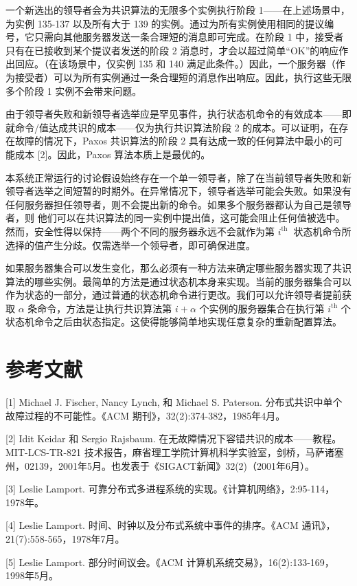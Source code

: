 \documentclass[12pt,a4paper]{report} %
\begin{document}
一个新选出的领导者会为共识算法的无限多个实例执行阶段 1——在上述场景中，为实例 135-137 以及所有大于 139 的实例。通过为所有实例使用相同的提议编号，它只需向其他服务器发送一条合理短的消息即可完成。在阶段 1 中，接受者只有在已接收到某个提议者发送的阶段 2 消息时，才会以超过简单“OK”的响应作出回应。（在该场景中，仅实例 135 和 140 满足此条件。）因此，一个服务器（作为接受者）可以为所有实例通过一条合理短的消息作出响应。因此，执行这些无限多个阶段 1 实例不会带来问题。

由于领导者失败和新领导者选举应是罕见事件，执行状态机命令的有效成本——即就命令/值达成共识的成本——仅为执行共识算法阶段 2 的成本。可以证明，在存在故障的情况下，Paxos 共识算法的阶段 2 具有达成一致的任何算法中最小的可能成本 [2]。因此，Paxos 算法本质上是最优的。

本系统正常运行的讨论假设始终存在一个单一领导者，除了在当前领导者失败和新领导者选举之间短暂的时期外。在异常情况下，领导者选举可能会失败。如果没有任何服务器担任领导者，则不会提出新的命令。如果多个服务器都认为自己是领导者，则
他们可以在共识算法的同一实例中提出值，这可能会阻止任何值被选中。然而，安全性得以保持——两个不同的服务器永远不会就作为第 $i^{\text {th }}$ 状态机命令所选择的值产生分歧。仅需选举一个领导者，即可确保进度。

如果服务器集合可以发生变化，那么必须有一种方法来确定哪些服务器实现了共识算法的哪些实例。最简单的方法是通过状态机本身来实现。当前的服务器集合可以作为状态的一部分，通过普通的状态机命令进行更改。我们可以允许领导者提前获取 $\alpha$ 条命令，方法是让执行共识算法第 $i+\alpha$ 个实例的服务器集合在执行第 $i^{\text {th}}$ 个状态机命令之后由状态指定。这使得能够简单地实现任意复杂的重新配置算法。

\section*{参考文献}

[1] Michael J. Fischer, Nancy Lynch, 和 Michael S. Paterson. 分布式共识中单个故障过程的不可能性。《ACM 期刊》，32(2):374-382，1985年4月。

[2] Idit Keidar 和 Sergio Rajsbaum. 在无故障情况下容错共识的成本——教程。MIT-LCS-TR-821 技术报告，麻省理工学院计算机科学实验室，剑桥，马萨诸塞州，02139，2001年5月。也发表于《SIGACT新闻》32(2)（2001年6月）。

[3] Leslie Lamport. 可靠分布式多进程系统的实现。《计算机网络》，2:95-114，1978年。

[4] Leslie Lamport. 时间、时钟以及分布式系统中事件的排序。《ACM 通讯》，21(7):558-565，1978年7月。

[5] Leslie Lamport. 部分时间议会。《ACM 计算机系统交易》，16(2):133-169，1998年5月。

\end{document}

